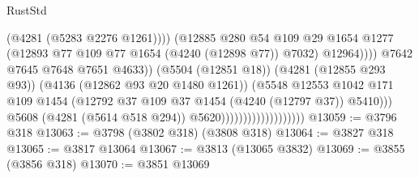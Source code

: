 \begin{lexlean}{RustStd}
\begin{coremodule}
{\begin{coremodule}
{{{{{{{{{{{{{{{{{{{{{{{{{{{{{{{{{{{                                                          (@4281 (@5283 @2276 @1261))))
                                                      (@12885
                                                        @280
                                                        @54
                                                        @109
                                                        @29
                                                        @1654
                                                        @1277
                                                        (@12893
                                                          @77
                                                          @109
                                                          @77
                                                          @1654
                                                          (@4240 (@12898 @77))
                                                          @7032)
                                                        @12964))))
                                                @7642
                                                @7645
                                                @7648
                                                @7651
                                                @4633))
                                            (@5504 (@12851 @18))
                                            (@4281 (@12855 @293 @93))
                                            (@4136 (@12862 @93 @20 @1480 @1261))
                                            (@5548
                                              @12553
                                              @1042
                                              @171
                                              @109
                                              @1454
                                              (@12792
                                                @37
                                                @109
                                                @37
                                                @1454
                                                (@4240 (@12797 @37))
                                                @5410)))
                                          @5608
                                          (@4281 (@5614 @518 @294))
                                          @5620)))))))))))))))))))
@13059 := @3796 @318
@13063 := @3798 (@3802 @318) (@3808 @318)
@13064 := @3827 @318
@13065 := @3817 @13064
@13067 := @3813 (@13065 @3832)
@13069 := @3855 (@3856 @318)
@13070 := @3851 @13069
}}}}}}}}}}}}}}}}}}}}}}}}}}}}}}}}}}}
\end{coremodule}}
\end{coremodule}
\end{lexlean}
